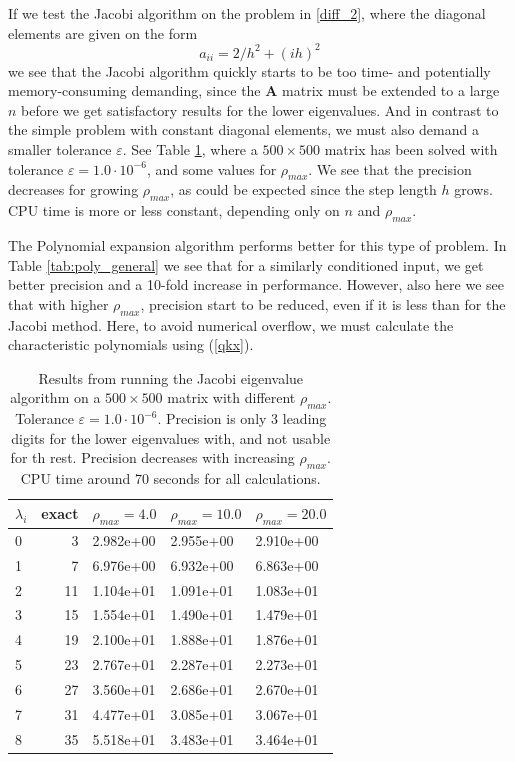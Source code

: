 \documentclass[]{article}
\begin{document}
If we test the Jacobi algorithm on the problem in \ref{diff_2}, where the diagonal elements are given on the form \cite{fys4150-p2} 
\[
a_{ii} = 2/h^2 + (ih)^2
\]
we see that the Jacobi algorithm quickly starts to be too time- and potentially memory-consuming demanding, since the $\mathbf{A}$ matrix must be extended to a large $n$ before we get satisfactory results for the lower eigenvalues. And in contrast to the simple problem with constant diagonal elements, we must also demand a smaller tolerance $\varepsilon$. See Table \ref{tab:jacobi_general}, where a $500 \times 500$ matrix has been solved with tolerance $\varepsilon = 1.0 \cdot 10^{-6}$, and some values for $\rho_{max}$. We see that the precision decreases for growing $\rho_{max}$, as could be expected since the step length $h$ grows. CPU time is more or less constant, depending only on $n$ and $\rho_{max}$.

The Polynomial expansion algorithm performs better for this type of problem. In Table \ref{tab:poly_general} we see that for a similarly conditioned input, we get better precision and a 10-fold increase in performance. However, also here we see that with higher $\rho_{max}$, precision start to be reduced, even if it is less than for the Jacobi method. Here, to avoid numerical overflow, we must calculate the characteristic polynomials using (\ref{qkx}).

\begin{table}[!ht]
	\caption{Results from running the Jacobi eigenvalue algorithm on a $500 \times 500$ matrix with different $\rho_{max}$. Tolerance $\varepsilon = 1.0 \cdot 10^{-6}$. Precision is only 3 leading digits for the lower eigenvalues with, and not usable for th rest. Precision decreases with increasing $\rho_{max}$. CPU time around 70 seconds for all calculations.}
	\label{tab:jacobi_general}
	\begin{center}
		\begin{tabular}{lrlll}
			\toprule
			$\lambda_i$ &              exact &            $\rho_{max} = 4.0$ &            $\rho_{max} = 10.0$ & $\rho_{max} = 20.0$\\
			\midrule
				0   & 3 & 2.982e+00 & 2.955e+00 & 2.910e+00 \\
				1   & 7 & 6.976e+00 & 6.932e+00 & 6.863e+00 \\
				2   & 11 & 1.104e+01 & 1.091e+01 & 1.083e+01 \\
				3   & 15 & 1.554e+01 & 1.490e+01 & 1.479e+01 \\
				4   & 19 & 2.100e+01 & 1.888e+01 & 1.876e+01 \\
				5   & 23 & 2.767e+01 & 2.287e+01 & 2.273e+01 \\
				6   & 27 & 3.560e+01 & 2.686e+01 & 2.670e+01 \\
				7   & 31 & 4.477e+01 & 3.085e+01 & 3.067e+01 \\
				8   & 35 & 5.518e+01 & 3.483e+01 & 3.464e+01 \\
			\bottomrule
		\end{tabular}
	\end{center}
\end{table}
\end{document}
